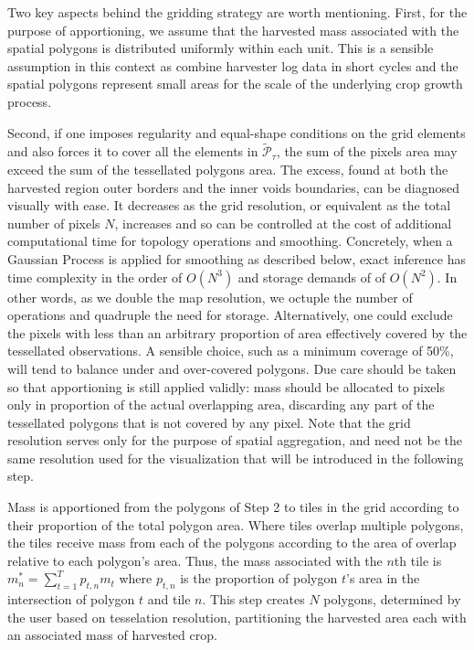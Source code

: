  Two key aspects behind the
gridding strategy are worth mentioning. First, for the purpose of
apportioning, we assume that the harvested mass associated with the
spatial polygons is distributed uniformly within each unit. This is a
sensible assumption in this context as combine harvester log data in
short cycles and the spatial polygons represent small areas for the
scale of the underlying crop growth process.

 Second, if one imposes regularity
and equal-shape conditions on the grid elements and also forces it to
cover all the elements in $\tilde{\mathcal{P}}_{\tau}$, the sum of the
pixels area may exceed the sum of the tessellated polygons area. The
excess, found at both the harvested region outer borders and the inner
voids boundaries, can be diagnosed visually with ease. It decreases as
the grid resolution, or equivalent as the total number of pixels $N$,
increases and so can be controlled at the cost of additional
computational time for topology operations and smoothing. %
Concretely, when a Gaussian Process is applied for smoothing as
described below, exact inference has time complexity in the order of
$O(N^3)$ and storage demands of of $O(N^2)$. In other words, as we
double the map resolution, we octuple the number of operations and
quadruple the need for storage.  Alternatively, one could exclude the
pixels with less than an arbitrary proportion of area effectively
covered by the tessellated observations. A sensible choice, such as a
minimum coverage of 50\%, will tend to balance under and over-covered
polygons. Due care should be taken so that apportioning is still
applied validly: mass should be allocated to pixels only in proportion
of the actual overlapping area, discarding any part of the tessellated
polygons that is not covered by any pixel. Note that the grid
resolution serves only for the purpose of spatial aggregation, and
need not be the same resolution used for the visualization that will
be introduced in the following step.

Mass is apportioned from the polygons of Step 2 to tiles in the
grid according to their proportion of the total polygon
area. Where tiles overlap multiple polygons, the tiles receive mass
from each of the polygons according to the area of overlap relative to
each polygon's area.  Thus, the mass associated with the $n$th tile is
$m_n^* = \sum_{t=1}^T p_{t,n} m_t$ where $p_{t,n}$ is the proportion
of polygon $t$'s area in the intersection of polygon $t$ and tile $n$.
This step creates $N$ polygons, determined by the user based on
tesselation resolution, partitioning the harvested area each with an
associated mass of harvested crop.

